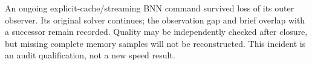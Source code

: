 An ongoing explicit-cache/streaming BNN command survived loss of its outer observer. Its original solver continues; the observation gap and brief overlap with a successor remain recorded. Quality may be independently checked after closure, but missing complete memory samples will not be reconstructed. This incident is an audit qualification, not a new speed result.